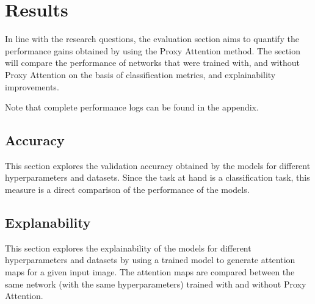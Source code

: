 \chapter{Results}
In line with the research questions, the evaluation section aims to quantify the performance gains obtained by using the Proxy Attention method. The section will compare the performance of networks that were trained with, and without Proxy Attention on the basis of classification metrics, and explainability improvements.

Note that complete performance logs can be found in the appendix.
\section{Accuracy}
This section explores the validation accuracy obtained by the models for different hyperparameters and datasets. Since the task at hand is a classification task, this measure is a direct comparison of the performance of the models.

\section{Explanability}
This section explores the explainability of the models for different hyperparameters and datasets by using a trained model to generate attention maps for a given input image. The attention maps are compared between the same network (with the same hyperparameters) trained with and without Proxy Attention.

